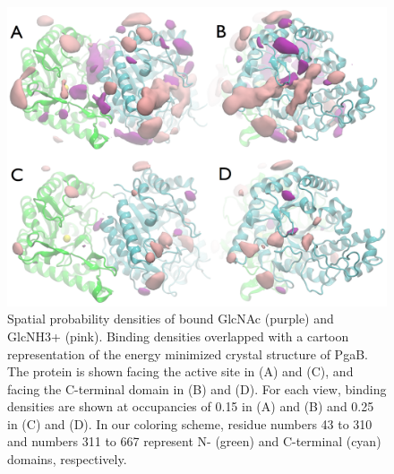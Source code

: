 \begin{figure}[htbp]
\centering
\includegraphics[width=6.25in]{figures/results4/glcnac_glucosamine_merged_sdf.pdf}
\caption[Spatial probability densities of bound GlcNAc (purple) and GlcNH3+]{Spatial probability densities of bound GlcNAc (purple) and GlcNH3+ (pink).  Binding densities overlapped with a cartoon representation of the energy minimized crystal structure of PgaB.  The protein is shown facing the active site in (A) and (C), and facing the C-terminal domain in (B) and (D). For each view, binding densities are shown at occupancies of 0.15 in (A) and (B) and 0.25 in (C) and (D). In our coloring scheme, residue numbers 43 to 310 and numbers 311 to 667 represent N- (green) and C-terminal (cyan) domains, respectively.}
\label{fig:sdf}
\end{figure}

